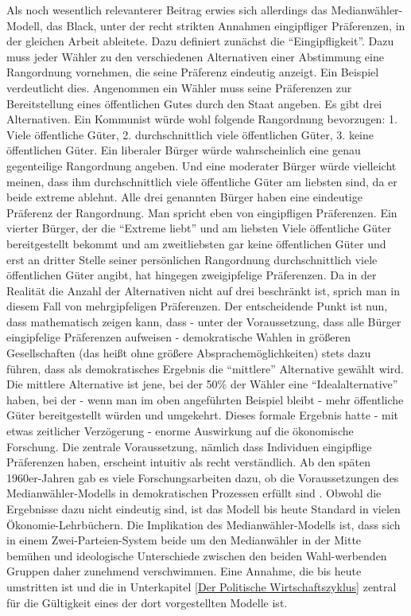 Als noch wesentlich relevanterer Beitrag erwies sich allerdings das Medianwähler-Modell, das Black, unter der recht strikten Annahmen eingipfliger Präferenzen, in der gleichen Arbeit \parencite[S. 28ff]{Black1948a} ableitete. Dazu definiert \textcite[S. 26]{Black1948a} zunächst die "`Eingipfligkeit"'. Dazu muss jeder Wähler zu den verschiedenen Alternativen einer Abstimmung eine Rangordnung vornehmen, die seine Präferenz eindeutig anzeigt. Ein Beispiel verdeutlicht dies. Angenommen ein Wähler muss seine Präferenzen zur Bereitstellung eines öffentlichen Gutes durch den Staat angeben. Es gibt drei Alternativen. Ein Kommunist würde wohl folgende Rangordnung bevorzugen: 1. Viele öffentliche Güter, 2. durchschnittlich viele öffentlichen Güter, 3. keine öffentlichen Güter. Ein liberaler Bürger würde wahrscheinlich eine genau gegenteilige Rangordnung angeben. Und eine moderater Bürger würde vielleicht meinen, dass ihm durchschnittlich viele öffentliche Güter am liebsten sind, da er beide extreme ablehnt. Alle drei genannten Bürger haben eine eindeutige Präferenz der Rangordnung. Man spricht eben von eingipfligen Präferenzen. Ein vierter Bürger, der die "`Extreme liebt"' und am liebsten Viele öffentliche Güter bereitgestellt bekommt und am zweitliebsten gar keine öffentlichen Güter und erst an dritter Stelle seiner persönlichen Rangordnung  durchschnittlich viele öffentlichen Güter angibt, hat hingegen zweigipfelige Präferenzen. Da in der Realität die Anzahl der Alternativen nicht auf drei beschränkt ist, sprich man in diesem Fall von mehrgipfeligen Präferenzen. Der entscheidende Punkt ist nun, dass \textcite[S. 27]{Black1948a} mathematisch zeigen kann, dass - unter der Voraussetzung, dass alle Bürger eingipfelige Präferenzen aufweisen - demokratische Wahlen in größeren Gesellschaften (das heißt ohne größere Absprachemöglichkeiten) stets dazu führen, dass als demokratisches Ergebnis die "`mittlere"' Alternative gewählt wird. Die mittlere Alternative ist jene, bei der 50\% der Wähler eine "`Idealalternative"' haben, bei der - wenn man im oben angeführten Beispiel bleibt -  mehr öffentliche Güter bereitgestellt würden und umgekehrt. Dieses formale Ergebnis hatte - mit etwas zeitlicher Verzögerung - enorme Auswirkung auf die ökonomische Forschung. Die zentrale Voraussetzung, nämlich dass Individuen eingipflige Präferenzen haben, erscheint intuitiv als recht verständlich. Ab den späten 1960er-Jahren gab es viele Forschungsarbeiten dazu, ob die Voraussetzungen des Medianwähler-Modells in demokratischen Prozessen erfüllt sind \parencite[S. 21ff]{Tullock1981}. Obwohl die Ergebnisse dazu nicht eindeutig sind, ist das Modell bis heute Standard in vielen Ökonomie-Lehrbüchern. Die Implikation des Medianwähler-Modells ist, dass sich in einem Zwei-Parteien-System beide um den Medianwähler in der Mitte bemühen und ideologische Unterschiede zwischen den beiden Wahl-werbenden Gruppen daher zunehmend verschwimmen. Eine Annahme, die bis heute umstritten ist und die in Unterkapitel \ref{Der Politische Wirtschaftszyklus} zentral für die Gültigkeit eines der dort vorgestellten Modelle ist.

